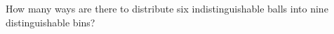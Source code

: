 \documentclass[../main.tex]{subfiles}
\begin{document}
How many ways are there to distribute six indistinguishable balls into nine distinguishable bins?

\solution
\end{document}
